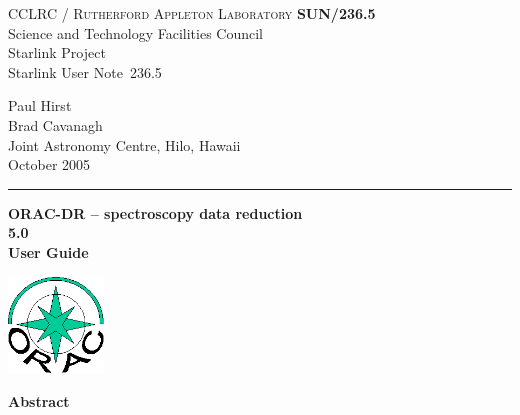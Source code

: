 \documentclass[twoside,11pt]{article}
\newcommand{\stardoccategory}  {Starlink User Note}
\newcommand{\stardocinitials}  {SUN}
\newcommand{\stardocnumber}    {236.5}
\newcommand{\stardocauthors}   {Paul Hirst \\ Brad Cavanagh \\
                                Joint Astronomy Centre, Hilo, Hawaii}
\newcommand{\stardocdate}      {October 2005}
\newcommand{\stardoctitle}     {ORAC-DR -- spectroscopy data reduction}
\newcommand{\stardocversion}   {5.0}
\newcommand{\stardocmanual}    {User Guide}
\newcommand{\stardocname}{\stardocinitials /\stardocnumber}
\newenvironment{latexonly}{}{}
\renewcommand{\_}{\texttt{\symbol{95}}}
\begin{document}
\setcounter{secnumdepth}{5}
\thispagestyle{empty}

\begin{latexonly}
   CCLRC / \textsc{Rutherford Appleton Laboratory} \hfill \textbf{\stardocname}\\
   {\large Science and Technology Facilities Council}\\
   {\large Starlink Project\\}
   {\large \stardoccategory\ \stardocnumber}
   \begin{flushright}
   \stardocauthors\\
   \stardocdate
   \end{flushright}
   \vspace{-4mm}
   \rule{\textwidth}{0.5mm}
   \vspace{5mm}
   \begin{center}
   {\Huge\textbf{\stardoctitle \\ [2.5ex]}}
   {\LARGE\textbf{\stardocversion \\ [4ex]}}
   {\Huge\textbf{\stardocmanual}}
   \end{center}
   \vspace{5mm}

\begin{center}
\includegraphics[width=1.0in]{sun236_logo}
\end{center}

   \vspace{10mm}
   \begin{center}
      {\Large\textbf{Abstract}}
   \end{center}
\end{latexonly}
\end{document}
